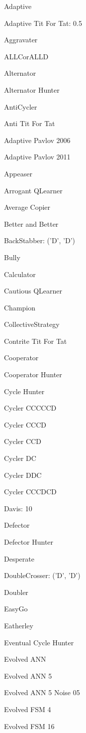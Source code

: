 \item Adaptive
\item Adaptive Tit For Tat: 0.5
\item Aggravater
\item ALLCorALLD
\item Alternator
\item Alternator Hunter
\item AntiCycler
\item Anti Tit For Tat
\item Adaptive Pavlov 2006
\item Adaptive Pavlov 2011
\item Appeaser
\item Arrogant QLearner
\item Average Copier
\item Better and Better
\item BackStabber: ('D', 'D')
\item Bully
\item Calculator
\item Cautious QLearner
\item Champion
\item CollectiveStrategy
\item Contrite Tit For Tat
\item Cooperator
\item Cooperator Hunter
\item Cycle Hunter
\item Cycler CCCCCD
\item Cycler CCCD
\item Cycler CCD
\item Cycler DC
\item Cycler DDC
\item Cycler CCCDCD
\item Davis: 10
\item Defector
\item Defector Hunter
\item Desperate
\item DoubleCrosser: ('D', 'D')
\item Doubler
\item EasyGo
\item Eatherley
\item Eventual Cycle Hunter
\item Evolved ANN
\item Evolved ANN 5
\item Evolved ANN 5 Noise 05
\item Evolved FSM 4
\item Evolved FSM 16
